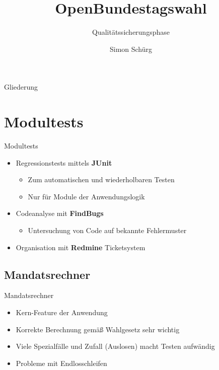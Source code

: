 \documentclass[18pt]{beamer}
\title[Qualitätssicherungsphase]{OpenBundestagswahl}
\subtitle{Qualitätssicherungsphase}
\author{Simon Schürg}
\institute{Praxis der Softwareentwicklung, WS 2013/14}
\begin{document}

\begin{frame}
\titlepage
\end{frame}

\begin{frame}{Gliederung}
\tableofcontents
\end{frame}


\section{Modultests}
\begin{frame}{Modultests}
\begin{itemize}
	\item Regressionstests mittels \textbf{JUnit}
	\begin{itemize}
		\item Zum automatischen und wiederholbaren Testen
		\item Nur für Module der Anwendungslogik
	\end{itemize}
	\item Codeanalyse mit \textbf{FindBugs}
	\begin{itemize}
		\item Untersuchung von Code auf bekannte Fehlermuster
	\end{itemize}
	\item Organisation mit \textbf{Redmine} Ticketsystem\\
\end{itemize}
\end{frame}

\subsection{Mandatsrechner}
\begin{frame}{Mandatsrechner}
\begin{itemize}
	\item Kern-Feature der Anwendung
	\item Korrekte Berechnung gemäß Wahlgesetz sehr wichtig
	\item Viele Spezialfälle und Zufall (Auslosen) macht Testen aufwändig
	\item Probleme mit Endlosschleifen
\end{itemize}
\end{frame}
\end{document}
